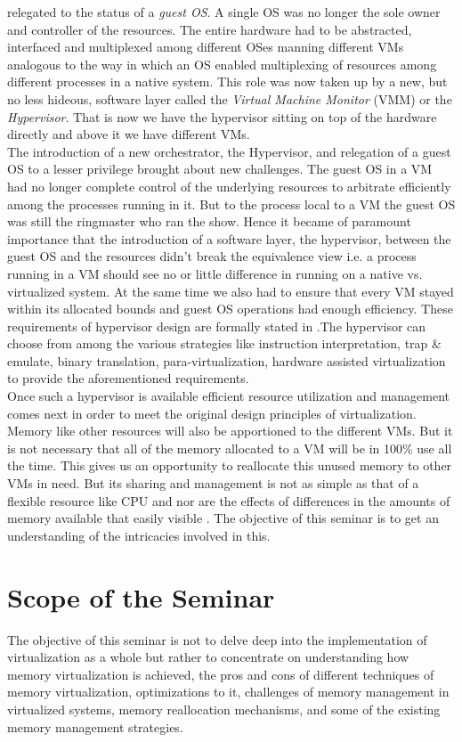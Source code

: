 relegated to the status of a \textit{guest OS}. A single OS was no longer the sole owner and
controller of the resources. The entire hardware had to be abstracted, interfaced and multiplexed
among different OSes manning different VMs analogous to the way in which an OS enabled
multiplexing of resources among different processes in a native system. This role was now taken up
by a new, but no less hideous, software layer called the \textit{Virtual Machine Monitor} (VMM) or
the \textit{Hypervisor}. That is now we have the hypervisor sitting on top of the hardware 
directly and above it we have different VMs.\\
The introduction of a new orchestrator, the Hypervisor, and relegation of a guest OS to a lesser
privilege brought about new challenges. The guest OS in a VM had no longer complete control of the
underlying resources to arbitrate efficiently among the processes running in it. But to the
process local to a VM the guest OS was still the ringmaster who ran the show. Hence it became of
paramount importance that the introduction of a software layer, the hypervisor, between the guest
OS and the resources didn't break the equivalence view  i.e. a process running in a VM should see
no or little difference in running on a native vs. virtualized system. At the same time we also
had to ensure that every VM stayed within its allocated bounds and guest OS operations had enough
efficiency. These requirements of hypervisor design are formally stated in 
\cite{popek1974formal}.The hypervisor can choose from among the various strategies like
instruction interpretation, trap \& emulate, binary translation, para-virtualization, hardware
assisted virtualization to provide the aforementioned requirements.\\
Once such a hypervisor is available efficient resource utilization and management comes next in
order to meet the original design principles of virtualization. Memory like other
resources will also be apportioned to the different VMs. But it is not necessary that all  of the
memory allocated to a VM will be in 100\% use all the time. This gives us an opportunity to
reallocate this unused memory to other VMs in need. But its sharing and management is not as
simple as that of a flexible resource like CPU and nor are the effects of differences in the
amounts of memory available that easily visible \citep{hwang2013mortar}. The objective of this
seminar is to get an understanding of the intricacies involved in this. 

\section{Scope of the Seminar} \label{scope}
The objective of this seminar is not to delve deep into the implementation of virtualization as a
whole but rather to concentrate on understanding how memory virtualization is achieved, the pros and cons of different techniques of memory virtualization, optimizations to it, challenges of memory management in virtualized systems, memory reallocation mechanisms, and some of the existing memory management strategies.     

